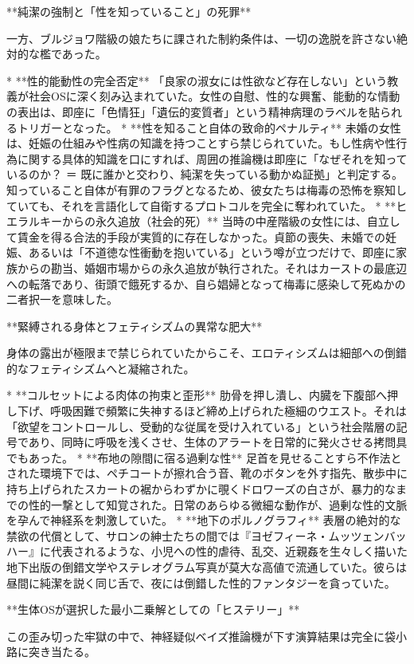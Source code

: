 **純潔の強制と「性を知っていること」の死罪**

一方、ブルジョワ階級の娘たちに課された制約条件は、一切の逸脱を許さない絶対的な檻であった。

* **性的能動性の完全否定**
「良家の淑女には性欲など存在しない」という教義が社会OSに深く刻み込まれていた。女性の自慰、性的な興奮、能動的な情動の表出は、即座に「色情狂」「遺伝的変質者」という精神病理のラベルを貼られるトリガーとなった。
* **性を知ること自体の致命的ペナルティ**
未婚の女性は、妊娠の仕組みや性病の知識を持つことすら禁じられていた。もし性病や性行為に関する具体的知識を口にすれば、周囲の推論機は即座に「なぜそれを知っているのか？ ＝ 既に誰かと交わり、純潔を失っている動かぬ証拠」と判定する。知っていること自体が有罪のフラグとなるため、彼女たちは梅毒の恐怖を察知していても、それを言語化して自衛するプロトコルを完全に奪われていた。
* **ヒエラルキーからの永久追放（社会的死）**
当時の中産階級の女性には、自立して賃金を得る合法的手段が実質的に存在しなかった。貞節の喪失、未婚での妊娠、あるいは「不道徳な性衝動を抱いている」という噂が立つだけで、即座に家族からの勘当、婚姻市場からの永久追放が執行された。それはカーストの最底辺への転落であり、街頭で餓死するか、自ら娼婦となって梅毒に感染して死ぬかの二者択一を意味した。

**緊縛される身体とフェティシズムの異常な肥大**

身体の露出が極限まで禁じられていたからこそ、エロティシズムは細部への倒錯的なフェティシズムへと凝縮された。

* **コルセットによる肉体の拘束と歪形**
肋骨を押し潰し、内臓を下腹部へ押し下げ、呼吸困難で頻繁に失神するほど締め上げられた極細のウエスト。それは「欲望をコントロールし、受動的な従属を受け入れている」という社会階層の記号であり、同時に呼吸を浅くさせ、生体のアラートを日常的に発火させる拷問具でもあった。
* **布地の隙間に宿る過剰な性**
足首を見せることすら不作法とされた環境下では、ペチコートが擦れ合う音、靴のボタンを外す指先、散歩中に持ち上げられたスカートの裾からわずかに覗くドロワーズの白さが、暴力的なまでの性的一撃として知覚された。日常のあらゆる微細な動作が、過剰な性的文脈を孕んで神経系を刺激していた。
* **地下のポルノグラフィ**
表層の絶対的な禁欲の代償として、サロンの紳士たちの間では『ヨゼフィーネ・ムッツェンバッハー』に代表されるような、小児への性的虐待、乱交、近親姦を生々しく描いた地下出版の倒錯文学やステレオグラム写真が莫大な高値で流通していた。彼らは昼間に純潔を説く同じ舌で、夜には倒錯した性的ファンタジーを貪っていた。

**生体OSが選択した最小二乗解としての「ヒステリー」**

この歪み切った牢獄の中で、神経疑似ベイズ推論機が下す演算結果は完全に袋小路に突き当たる。

